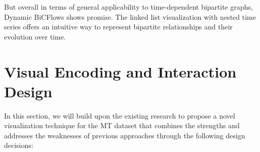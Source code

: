 \documentclass{vgtc}
\begin{document}
But overall in terms of general applicability to time-dependent bipartite graphs, Dynamic BiCFlows shows promise. The linked list visualization with nested time series offers an intuitive way to represent bipartite relationships and their evolution over time.

\section{Visual Encoding and Interaction Design} %

In this section, we will build upon the existing research to propose a novel visualization technique for the MT dataset that combines the strengths and addresses the weaknesses of previous approaches through the following design decisions:
\end{document}
